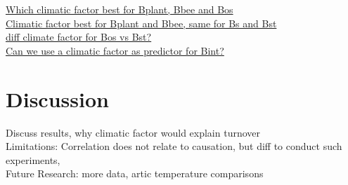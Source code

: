 \documentclass[11pt]{article}
\begin{document}
\begin{figure}[H]
  \label{fig:plant-bee}
\end{figure}

\begin{figure}[H]
  \label{fig:plant-bee}
\end{figure}

\underline{Which climatic factor best for Bplant, Bbee and Bos} \\

\underline{Climatic factor best for Bplant and Bbee, same for Bs and Bst} \\

\underline{diff climate factor for Bos vs Bst? } \\

\underline{Can we use a climatic factor as predictor for Bint?} \\

\newpage
\section{Discussion} %
Discuss results, why climatic factor would explain turnover \\
Limitations: Correlation does not relate to causation, but diff to conduct such experiments,  \\
Future Research: more data, artic temperature comparisons \\
\end{document}
